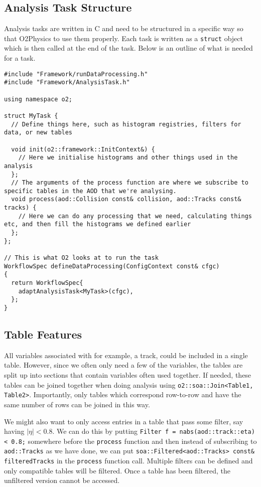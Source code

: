 \subsection{Analysis Task Structure}\label{sec:TaskStructure}
Analysis tasks are written in C\OldTexttt{++} and need to be structured in a specific way so that O2Physics to use them properly. Each task is written as a \texttt{struct} object which is then called at the end of the task. Below is an outline of what is needed for a task.

\begin{verbatim}
#include "Framework/runDataProcessing.h"
#include "Framework/AnalysisTask.h"

using namespace o2;

struct MyTask {
  // Define things here, such as histogram registries, filters for data, or new tables

  void init(o2::framework::InitContext&) {
    // Here we initialise histograms and other things used in the analysis
  };
  // The arguments of the process function are where we subscribe to specific tables in the AOD that we're analysing. 
  void process(aod::Collision const& collision, aod::Tracks const& tracks) {
    // Here we can do any processing that we need, calculating things etc, and then fill the histograms we defined earlier
  };
};

// This is what O2 looks at to run the task
WorkflowSpec defineDataProcessing(ConfigContext const& cfgc)
{
  return WorkflowSpec{
    adaptAnalysisTask<MyTask>(cfgc),
  };
}
\end{verbatim}

\subsection{Table Features}
All variables associated with for example, a track, could be included in a single table. However, since we often only need a few of the variables, the tables are split up into sections that contain variables often used together. If needed, these tables can be joined together when doing analysis using \texttt{o2::soa::Join<Table1, Table2>}. Importantly, only tables which correspond row-to-row and have the same number of rows can be joined in this way.

We might also want to only access entries in a table that pass some filter, say having $|\eta| < 0.8$. We can do this by putting \texttt{Filter f = nabs(aod::track::eta) < 0.8;} somewhere before the \texttt{process} function and then instead of subscribing to \texttt{aod::Tracks} as we have done, we can put \texttt{soa::Filtered<aod::Tracks> const\& filteredTracks} in the \texttt{process} function call. Multiple filters can be defined and only compatible tables will be filtered. Once a table has been filtered, the unfiltered version cannot be accessed. 

